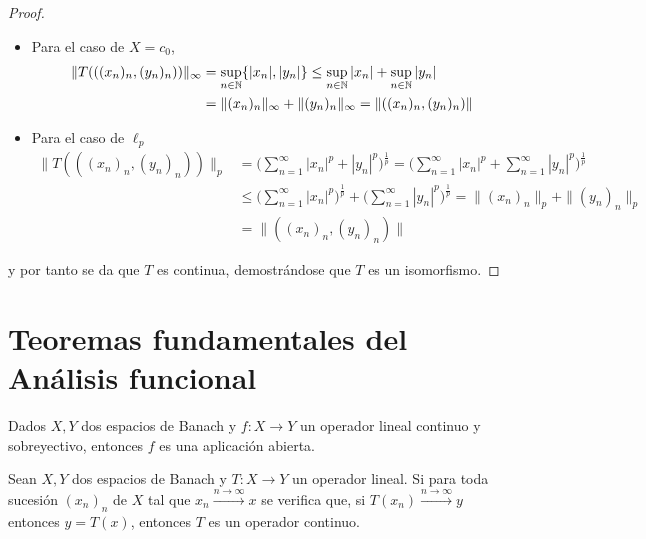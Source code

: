 \begin{proof}
					\begin{itemize}
						\item Para el caso de $X = c_0$,
						\begin{align*}
							\|T(((x_n)_n,(y_n)_n))\|_\infty & = \sup_{n \in \mathbb{N}}\{|x_n|,|y_n|\} \leq \sup_{n \in \mathbb{N}}|x_n| + \sup_{n \in \mathbb{N}}|y_n| \\&= \|(x_n)_n\|_\infty+\|(y_n)_n\|_\infty = \|((x_n)_n,(y_n)_n)\|
						\end{align*}
						\item Para el caso de $\ell_p$
						\begin{align*}
							\|T(((x_n)_n,(y_n)_n))\|_p & = \big(\sum_{n = 1}^\infty |x_n|^p + |y_n|^p\big)^\frac{1}{p} = \big(\sum_{n = 1}^\infty |x_n|^p +\sum_{n =1}^\infty |y_n|^p\big)^\frac{1}{p}\\ &\leq \big(\sum_{n = 1}^\infty |x_n|^p\big)^\frac{1}{p} + \big(\sum_{n = 1}^\infty|y_n|^p\big)^\frac{1}{p} = \|(x_n)_n\|_p+\|(y_n)_n\|_p \\&= \|((x_n)_n,(y_n)_n)\|
						\end{align*}
					\end{itemize}
					y por tanto se da que $T$ es continua, demostrándose que $T$ es un isomorfismo. 
				\end{proof}
			
			
			\newpage
			\section*{Teoremas fundamentales del Análisis funcional}
			
			
			
			
			\begin{theorem}\label{th:ap-abierta}
				Dados $X,Y$ dos espacios de Banach y $f:X \rightarrow Y$ un operador lineal continuo y sobreyectivo, entonces $f$ es una aplicación abierta.
			\end{theorem}
			
			\begin{theorem}\label{th:grafo-cerrado}
				Sean $X,Y$ dos espacios de Banach y $T\colon X \to Y$ un operador lineal. Si para toda sucesión $(x_n)_n$ de $X$ tal que $x_n\xrightarrow{n\to\infty}x$ se verifica que, si $T(x_n) \xrightarrow{n\to \infty}y$ entonces $y = T(x)$, entonces $T$ es un operador continuo.
			\end{theorem}
			
